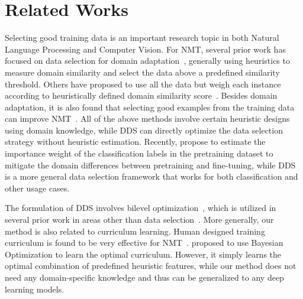 \section{\label{sec:related_work}Related Works}

Selecting good training data is an important research topic in both Natural Language Processing and Computer Vision. For NMT, several prior work has focused on data selection for domain adaptation~\citep{moore2010intelligent,axelrod2011domain}, generally using heuristics to measure domain similarity and select the data above a predefined similarity threshold. Others have proposed to use all the data but weigh each instance according to heuristically defined domain similarity score~\citep{jiang-zhai-2007-instance,foster-etal-2010-discriminative,wang-etal-2017-instance}. Besides domain adaptation, it is also found that selecting good examples from the training data can improve NMT~\citep{vyas-etal-2018-identifying,pham-etal-2018-fixing}. All of the above methods involve certain heuristic designs using domain knowledge, while DDS can directly optimize the data selection strategy without heuristic estimation. Recently, \cite{domain_adapt_transfer} propose to estimate the importance weight of the classification labels in the pretraining dataset to mitigate the domain differences between pretraining and fine-tuning, while DDS is a more general data selection framework that works for both classification and other usage cases.  

The formulation of DDS involves bilevel optimization~\citep{bilevel_optim,hier_optim}, which is utilized in several prior work in areas other than data selection~\citep{darts,hyper_grad,finn2017model}. More generally, our method is also related to curriculum learning. Human designed training curriculum is found to be very effective for NMT~\citep{zhang2016boosting,zhang2018empirical,platanios19naacl}. \cite{baysian_curriculum} proposed to use Bayesian Optimization to learn the optimal curriculum. However, it simply learns the optimal combination of predefined heuristic features, while our method does not need any domain-specific knowledge and thus can be generalized to any deep learning models.    



